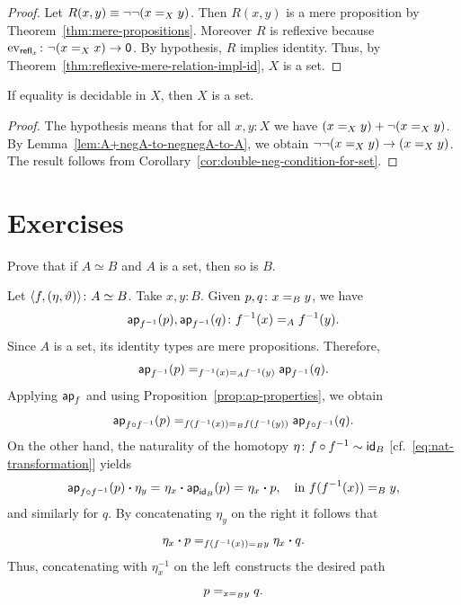 \begin{proof}
    Let $R(x,y)\equiv\neg\neg(x\mathrel{=_{X}}y)$. Then $R(x,y)$ is a mere proposition by Theorem~\ref{thm:mere-propositions}. Moreover $R$ is reflexive because $\ev{\fun{refl}_x}\colon\neg(x\eq Xx)\to\fun0$.
    By hypothesis, $R$ implies identity. Thus, by Theorem~\ref{thm:reflexive-mere-relation-impl-id}, $X$ is a set.
\end{proof}

\begin{thm}[Hedberg]
    If equality is decidable in\/ $X$, then\/ $X$ is a set.
\end{thm}

\begin{proof}
    The hypothesis means that for all $x,y\colon X$ we have $(x\mathrel{=_{X}}y)+\neg(x\mathrel{=_{X}}y)$. By Lemma~\ref{lem:A+negA-to-negnegA-to-A}, we obtain $\neg\neg(x\mathrel{=_{X}}y)\to(x\mathrel{=_{X}}y)$. The result follows from Corollary~\ref{cor:double-neg-condition-for-set}.
    
\end{proof}

\section{Exercises}

\begin{exr}\fe\label{exr:equivalent-to-set-is-set}
    Prove that if\/ $A\simeq B$ and\/ $A$ is a set, then so is\/ $B$.
\end{exr}

\begin{solution}
    Let $\dep{f,(\eta,\vartheta)}\colon A\simeq B$. Take $x,y\colon B$. Given $p,q\colon x\eq By$, we have
    \[
        \fun{ap}_{f^{-1}}(p),\fun{ap}_{f^{-1}}(q)
            \colon f^{-1}(x)\eq A f^{-1}(y).
    \]
    Since $A$ is a set, its identity types are mere propositions. Therefore,
    \[
        \mathsf{ap}_{f^{-1}}(p)
        \mathrel{=_{f^{-1}(x)\mathrel{=_{A}} f^{-1}(y)}}
        \mathsf{ap}_{f^{-1}}(q).
    \]
    Applying $\mathsf{ap}_f$ and using Proposition~\ref{prop:ap-properties}, we obtain
    \[
        \mathsf{ap}_{f\circ f^{-1}}(p)
        \mathrel{=_{f(f^{-1}(x))\mathrel{=_{B}} f(f^{-1}(y))}}
        \mathsf{ap}_{f\circ f^{-1}}(q).
    \]
    On the other hand, the naturality of the homotopy $\eta\colon f\circ f^{-1}\sim\id_B$ [cf.~\eqref{eq:nat-transformation}] yields
    \[
        \mathsf{ap}_{f\circ f^{-1}}(p)\mathbin{\boldsymbol{\cdot}}\eta_y
            \mathrel{=_{}}\eta_x\mathbin{\boldsymbol{\cdot}}\mathsf{ap}_{\mathsf{id}_B}(p)
            \mathrel{=_{}}\eta_x\mathbin{\boldsymbol{\cdot}} p,
            \quad\text{in }f(f^{-1}(x))\mathrel{=_{B}} y,
    \]
    and similarly for $q$. By concatenating $\eta_y$ on the right it follows that
    \[
        \eta_x\mathbin{\boldsymbol{\cdot}} p
        \mathrel{=_{f(f^{-1}(x))\mathrel{=_{B}} y}}
        \eta_x\mathbin{\boldsymbol{\cdot}} q.
    \]
    Thus, concatenating with $\eta_x^{-1}$ on the left constructs the desired path
    \[
        p\mathrel{=_{x\mathrel{=_{B}}y}}q.
    \]
\end{solution}


